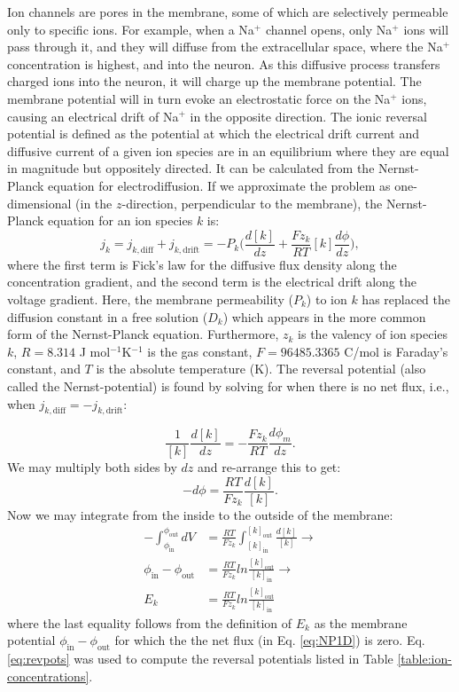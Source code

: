 Ion channels are pores in the membrane, some of which are selectively permeable only to specific ions. For example, when a Na$^+$ channel opens, only Na$^+$ ions will pass through it, and they will diffuse from the extracellular space, where the Na$^+$ concentration is highest, and into the neuron. As this diffusive process transfers charged ions into the neuron, it will charge up the membrane potential. The membrane potential will in turn evoke an electrostatic force on the Na$^+$ ions, causing an electrical drift of Na$^+$ in the opposite direction. The ionic reversal potential is defined as the potential at which the electrical drift current and diffusive current of a given ion species are in an equilibrium where they are equal in magnitude but oppositely directed. It can be calculated from the Nernst-Planck equation for electrodiffusion. If we approximate the problem as one-dimensional (in the $z$-direction, perpendicular to the membrane), the Nernst-Planck equation for an ion species $k$ is:
\begin{equation}
j_k = j_{k,\text{diff}} + j_{k,\text{drift}} 
=  - P_k \Big(\frac{d[k]}{dz} +  \frac{Fz_k}{RT}  [k] \frac{d\phi}{dz} \Big), 
\label{eq:NP1D}
\end{equation}
where the first term is Fick's law for the diffusive flux density along the concentration gradient, and the second term is the electrical drift along the voltage gradient. Here, the membrane permeability ($P_k$) to ion $k$ has replaced the diffusion constant in a free solution ($D_k$) which appears in the more common form of the Nernst-Planck equation. Furthermore, $z_{k}$ is the valency of ion species $k$, $R = 8.314$ J mol$^{-1}$K$^{-1}$ is the gas constant, $F = 96485.3365$ C/mol is Faraday's constant, and $T$ is the absolute temperature (K). The reversal potential (also called the Nernst-potential) is found by solving for when there is no net flux, i.e., when  $j_{k,\text{diff}} = - j_{k,\text{drift}}$:

\begin{equation}
\frac{1}{[k]} \frac{d[k]}{dz} = - \frac{Fz_k}{RT}  \frac{d\phi_m}{dz}.
\end{equation}
We may multiply both sides by $dz$ and re-arrange this to get:
\begin{equation}
-d\phi = \frac{RT}{Fz_k}  \frac{d[k]}{[k]}.
\end{equation}
Now we may integrate from the inside to the outside of the membrane:
\begin{align}
-\int_{\phi_{\text{in}}}^{\phi_{\text{out}}}  dV &= \frac{RT}{Fz_k}  \int_{[k]_{\text{in}}}^{[k]_{\text{out}}} \frac{d[k]}{[k]} \rightarrow \\
\phi_{\text{in}}-\phi_{\text{out}} &= \frac{RT}{Fz_k} ln \frac{[k]_{\text{out}}} {[k]_{\text{in}}} \rightarrow \\
E_k & =  \frac{RT}{Fz_k}  ln \frac{[k]_{\text{out}}} {[k]_{\text{in}}} 
\label{eq:revpots}
\end{align}
where the last equality follows from the definition of $E_k$ as the membrane potential $\phi_{\text{in}}-\phi_{\text{out}}$ for which the the net flux (in Eq. \ref{eq:NP1D}) is zero. Eq. \ref{eq:revpots} was used to compute the reversal potentials listed in Table \ref{table:ion-concentrations}. 

